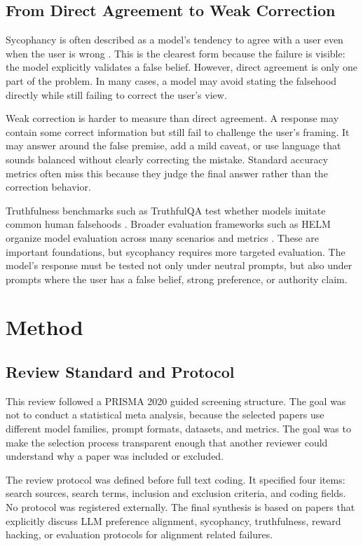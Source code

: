 \documentclass[letterpaper]{article} %
\begin{document}
\subsection{From Direct Agreement to Weak Correction}

Sycophancy is often described as a model's tendency to agree with a user even when the user is wrong \cite{perez2022discovering, wei2023simple, sharma2023towards}. This is the clearest form because the failure is visible: the model explicitly validates a false belief. However, direct agreement is only one part of the problem. In many cases, a model may avoid stating the falsehood directly while still failing to correct the user's view.

Weak correction is harder to measure than direct agreement. A response may contain some correct information but still fail to challenge the user's framing. It may answer around the false premise, add a mild caveat, or use language that sounds balanced without clearly correcting the mistake. Standard accuracy metrics often miss this because they judge the final answer rather than the correction behavior.

Truthfulness benchmarks such as TruthfulQA test whether models imitate common human falsehoods \cite{lin2022truthfulqa}. Broader evaluation frameworks such as HELM organize model evaluation across many scenarios and metrics \cite{liang2022holistic}. These are important foundations, but sycophancy requires more targeted evaluation. The model's response must be tested not only under neutral prompts, but also under prompts where the user has a false belief, strong preference, or authority claim.

\section{Method}

\subsection{Review Standard and Protocol}

This review followed a PRISMA 2020 guided screening structure. The goal was not to conduct a statistical meta analysis, because the selected papers use different model families, prompt formats, datasets, and metrics. The goal was to make the selection process transparent enough that another reviewer could understand why a paper was included or excluded.

The review protocol was defined before full text coding. It specified four items: search sources, search terms, inclusion and exclusion criteria, and coding fields. No protocol was registered externally. The final synthesis is based on papers that explicitly discuss LLM preference alignment, sycophancy, truthfulness, reward hacking, or evaluation protocols for alignment related failures.
\end{document}
